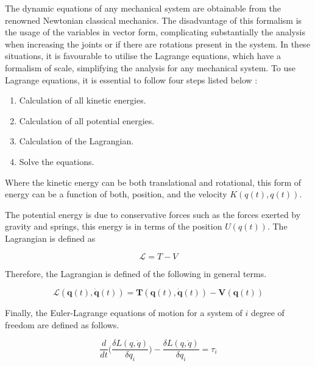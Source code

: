 \documentclass{UoNMCHA}
\numberwithin{equation}{section}
\begin{document}
	The dynamic equations of any mechanical system are obtainable from the renowned Newtonian classical mechanics. The disadvantage of this formalism is the usage of the variables in vector form, complicating substantially the analysis when increasing the joints or if there are rotations present in the system. In these situations, it is favourable to utilise the Lagrange equations, which have a formalism of scale, simplifying the analysis for any mechanical system. To use Lagrange equations, it is essential to follow four steps listed below \cite{duartemadrid_2017_dynamic} :
	
	\begin{enumerate}
		\item Calculation of all kinetic energies.
		\item Calculation of all potential energies.
		\item Calculation of the Lagrangian.
		\item Solve the equations.
		
	\end{enumerate}
	
	Where the kinetic energy can be both translational and rotational, this form of energy can be a function of both, position, and the velocity $K(q(t), q(t))$.
	
	\newpage
	
	The potential energy is due to conservative forces such as the forces exerted by gravity and springs, this energy is in terms of the position $U(q(t))$. The Lagrangian is defined as
	
	\begin{equation}
	\mathcal{L}=T-V
	\end{equation}
	
	Therefore, the Lagrangian is defined of the following in general terms.
	
	\begin{equation}
	\mathcal{L}(\boldsymbol{q}(t), \dot{\boldsymbol{q}}(t))=\boldsymbol{T}(\boldsymbol{q}(t), \dot{\boldsymbol{q}}(t))-\boldsymbol{V}(\boldsymbol{q}(t))
	\end{equation}
	
	Finally, the Euler-Lagrange equations of motion for a system of $ i $ degree of freedom are defined as follows.
	
	\begin{equation}
	\frac{d}{dt}\big(  \frac{\delta L(q,\dot{q})}{\delta q_{i}} \big) -\frac{\delta L(q,\dot{q})}{\delta q_i}=\tau_i
	\end{equation}
	
\end{document}
